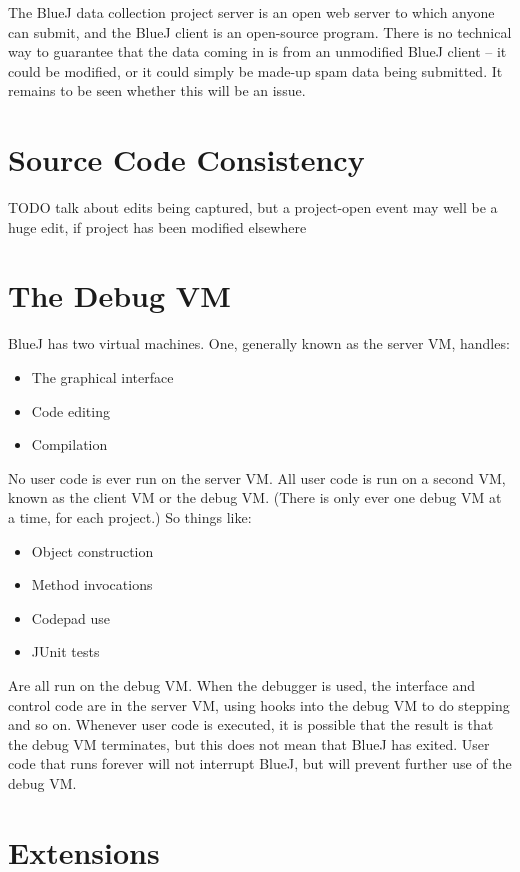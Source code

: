 \documentclass{book}
\begin{document}
The BlueJ data collection project server is an open web server to which anyone
can submit, and the BlueJ client is an open-source program.  There is no
technical way to guarantee that the data coming in is from an unmodified BlueJ
client -- it could be modified, or it could simply be made-up spam data being
submitted.  It remains to be seen whether this will be an issue.

\section{Source Code Consistency}

TODO talk about edits being captured, but a project-open event may well be a
huge edit, if project has been modified elsewhere

\section{The Debug VM}

BlueJ has two virtual machines.  One, generally known as the server VM,
handles:

\begin{itemize}
\item The graphical interface
\item Code editing
\item Compilation
\end{itemize}

No user code is ever run on the server VM.  All user code is run on a second
VM, known as the client VM or the debug VM.  (There is only ever one debug VM
at a time, for each project.)  So things like:

\begin{itemize}
\item Object construction
\item Method invocations
\item Codepad use
\item JUnit tests
\end{itemize}

Are all run on the debug VM.  When the debugger is used, the interface and
control code are in the server VM, using hooks into the debug VM to do
stepping and so on.  Whenever user code is executed, it is possible that the
result is that the debug VM terminates, but this does not mean that BlueJ has
exited.  User code that runs forever will not interrupt BlueJ, but will
prevent further use of the debug VM.


\section{Extensions}
\end{document}
